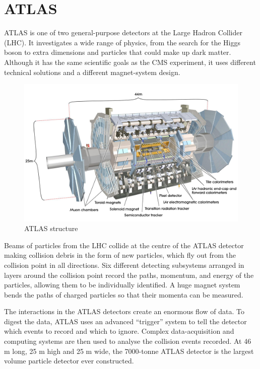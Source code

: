 \documentclass[a4paper, oneside]{book}
\begin{document}
		\section{ATLAS}	
			\cite{ATLAS intro}ATLAS is one of two general-purpose detectors at the Large Hadron Collider (LHC). It investigates a wide range of physics, from the search for the Higgs boson to extra dimensions and particles that could make up dark matter. Although it has the same scientific goals as the CMS experiment, it uses different technical solutions and a different magnet-system design.
			\begin{figure}[H]
				\centering
				\includegraphics[width=0.45\textheight]{tesi_images/atlas_structure.jpg}
				\caption{ATLAS structure}
				\label{fig:ATLAS structure}
			\end{figure}
		
			Beams of particles from the LHC collide at the centre of the ATLAS detector making collision debris in the form of new particles, which fly out from the collision point in all directions. Six different detecting subsystems arranged in layers around the collision point record the paths, momentum, and energy of the particles, allowing them to be individually identified. A huge magnet system bends the paths of charged particles so that their momenta can be measured.
		
			The interactions in the ATLAS detectors create an enormous flow of data. To digest the data, ATLAS uses an advanced “trigger” system to tell the detector which events to record and which to ignore. Complex data-acquisition and computing systems are then used to analyse the collision events recorded. At 46 m long, 25 m high and 25 m wide, the 7000-tonne ATLAS detector is the largest volume particle detector ever constructed. 
\end{document}
